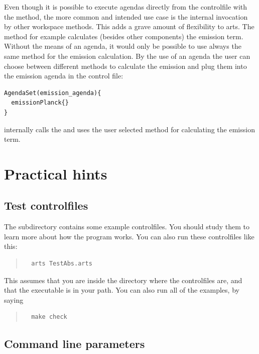 Even though it is possible to execute agendas directly from the
controlfile with the  method, the more common
and intended use case is the internal invocation by other workspace
methods. This adds a grave amount of flexibility to arts. The
 method for example calculates (besides other
components) the emission term. Without the means of an agenda, it
would only be possible to use always the same method for the emission
calculation. By the use of an agenda the user can choose between
different methods to calculate the emission and plug them into the
emission agenda in the control file:

{\small
\begin{verbatim}
AgendaSet(emission_agenda){
  emissionPlanck{}
}
\end{verbatim}
}

\noindent
{} internally calls the  and
uses the user selected method for calculating the emission term.



\section{Practical hints}
\label{sec:concept:practical}

\subsection{Test controlfiles}

The subdirectory  contains some example controlfiles.
You should study them to learn more about how the program works. You
can also run these controlfiles like this:
\begin{quote}
\begin{verbatim}
  arts TestAbs.arts
\end{verbatim}
\end{quote}
This assumes that you are inside the directory where the controlfiles
are, and that the  executable is in your path.  You can
also run all of the examples, by saying
\begin{quote}
\begin{verbatim}
  make check
\end{verbatim}
\end{quote}

\subsection{Command line parameters}

